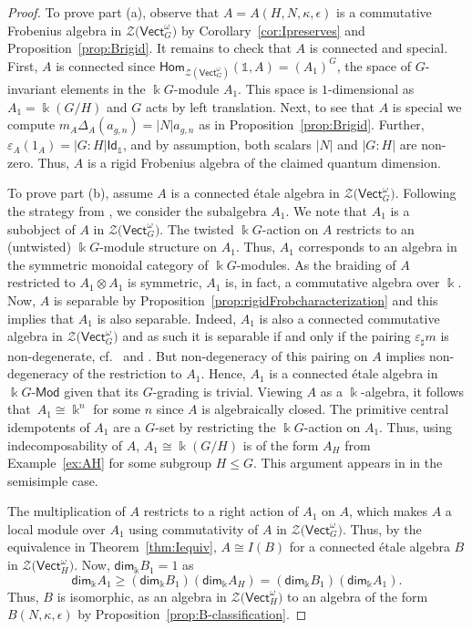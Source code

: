 \documentclass[pdftex]{sigma}
\numberwithin{equation}{section}
\newcommand{\lmod}[1]{#1\text{-}\mathsf{Mod}}
\newcommand{\Hom}{\mathsf{Hom}}
\newcommand{\ide}{\mathsf{Id}}
\newcommand{\one}{\mathds{1}}
\renewcommand{\dim}{\mathsf{dim}}
\newcommand{\Vect}{\mathsf{Vect}}
\newcommand{\cZ}{\mathcal{Z}}
\newcommand{\rI}{I}
\begin{document}
\begin{proof}
To prove part (a), observe that $A=A(H,N,\kappa,\epsilon)$ is a commutative Frobenius algebra in $\cZ\big(\Vect_G^\omega\big)$ by Corollary~\ref{cor:Ipreserves} and Proposition~\ref{prop:Brigid}. It remains to check that $A$ is connected and special. First, $A$ is connected since
$\Hom_{\cZ(\Vect_G^\omega)}(\one,A)= (A_1)^G$, the space of $G$-invariant elements in the $\Bbbk G$-module $A_1$. This space is $1$-dimensional as $A_1=\Bbbk(G/H)$ and $G$ acts by left translation. Next, to see that $A$ is special we compute
$m_A\Delta_A(a_{g,n})=|N| a_{g,n}$ as in Proposition~\ref{prop:Brigid}. Further, $\varepsilon_A(1_A)=|G:H|\ide_{\one}$,
and by assumption, both scalars $|N|$ and $|G:H|$ are non-zero. Thus, $A$ is a rigid Frobenius algebra of the claimed quantum dimension.

To prove part (b), assume $A$ is a connected \'etale algebra in $\cZ\big(\Vect_G^\omega\big)$. Following the strategy from \cite[Corollary~3.3.5]{Dav3}, we consider the subalgebra $A_1$. We note that $A_1$ is a subobject of $A$ in $\cZ\big(\Vect_G^\omega\big)$. The twisted $\Bbbk G$-action on $A$ restricts to an (untwisted) $\Bbbk G$-module structure on $A_1$.
Thus, $A_1$ corresponds to an algebra in the symmetric monoidal category of $\Bbbk G$-modules. As the braiding of $A$ restricted to $A_1\otimes A_1$ is symmetric, $A_1$ is, in fact, a commutative algebra over $\Bbbk$.
Now, $A$ is separable by Proposition~\ref{prop:rigidFrobcharacterization} and this implies that $A_1$ is also separable. Indeed, $A_1$ is also a connected commutative algebra in $\cZ\big(\Vect_G^\omega\big)$ and as such it is separable if and only if the pairing $\varepsilon_\sharp m$ is non-degenerate, cf.\ \cite[Section 2.2]{Dav3} and \cite[Section 3.3]{LW3}. But non-degeneracy of this pairing on $A$ implies non-degeneracy of the restriction to $A_1$.
Hence, $A_1$ is a connected \'etale algebra in $\lmod{\Bbbk G}$ given that its $G$-grading is trivial. Viewing $A$ as a $\Bbbk$-algebra, it follows that~$A_1\cong \Bbbk ^n$ for some $n$ since $A$ is algebraically closed. The primitive central idempotents of $A_1$ are a $G$-set by restricting the $\Bbbk G$-action on $A_1$. Thus, using indecomposability of $A$, $A_1\cong \Bbbk(G/H)$ is of the form $A_H$ from Example~\ref{ex:AH} for some subgroup $H\leq G$. This argument appears in \cite[Theorem~2.2]{KO} in the semisimple case.

The multiplication of $A$ restricts to a right action of $A_1$ on $A$, which makes $A$ a local module over $A_1$ using commutativity of $A$ in $\cZ\big(\Vect_G^\omega\big)$. Thus, by the equivalence in Theorem~\ref{thm:Iequiv}, $A\cong \rI(B)$ for a connected \'etale algebra $B$ in $\cZ\big(\Vect_H^\omega\big)$.
Now, $\dim_\Bbbk B_1=1$ as \[\dim_\Bbbk A_1\geq (\dim_\Bbbk B_1)(\dim_\Bbbk A_H)=(\dim_\Bbbk B_1)(\dim_\Bbbk A_1).\]
Thus, $B$ is isomorphic, as an algebra in $\cZ\big(\Vect_H^\omega\big)$ to an algebra of the form $B(N,\kappa, \epsilon)$ by Proposition~\ref{prop:B-classification}.


\end{proof}
\end{document}
